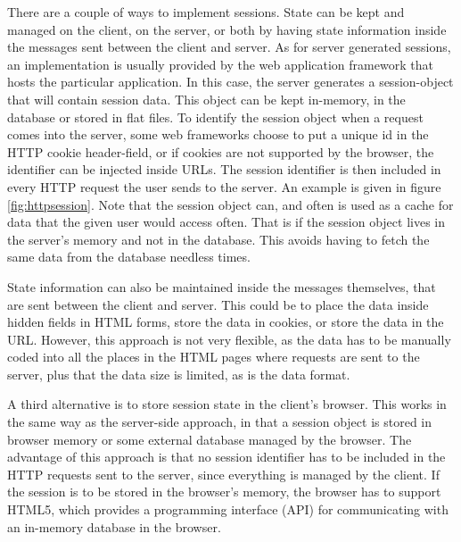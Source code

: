There are a couple of ways to implement sessions. State can be kept and managed on the client, on the server, or both by having state information inside the messages sent between the client and server. As for server generated sessions, an implementation is usually provided by the web application framework that hosts the particular application. In this case, the server generates a session-object that will contain session data. This object can be kept in-memory, in the database or stored in flat files. To identify the session object when a request comes into the server, some web frameworks choose to put a unique id in the HTTP cookie header-field, or if cookies are not supported by the browser, the identifier can be injected inside URLs. The session identifier is then included in every HTTP request the user sends to the server. An example is given in figure \vref{fig:httpsession}. Note that the session object can, and often is used as a cache for data that the given user would access often. That is if the session object lives in the server's memory and not in the database. This avoids having to fetch the same data from the database needless times.

State information can also be maintained inside the messages themselves, that are sent between the client and server. This could be to place the data inside hidden fields in HTML forms, store the data in cookies, or store the data in the URL. However, this approach is not very flexible, as the data has to be manually coded into all the places in the HTML pages where requests are sent to the server, plus that the data size is limited, as is the data format.

A third alternative is to store session state in the client's browser. This works in the same way as the server-side approach, in that a session object is stored in browser memory or some external database managed by the browser. The advantage of this approach is that no session identifier has to be included in the HTTP requests sent to the server, since everything is managed by the client. If the session is to be stored in the browser's memory, the browser has to support HTML5, which provides a programming interface (API) for communicating with an in-memory database in the browser.  

